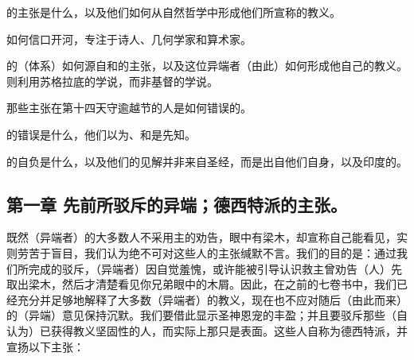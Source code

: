 的主张是什么，以及他们如何从自然哲学中形成他们所宣称的教义。\par

如何信口开河，专注于诗人、几何学家和算术家。\par

的（体系）如何源自和的主张，以及这位异端者（由此）如何形成他自己的教义。则利用苏格拉底的学说，而非基督的学说。\par

那些主张在第十四天守逾越节的人是如何错误的。\par

的错误是什么，他们以为、和是先知。\par

的自负是什么，以及他们的见解并非来自圣经，而是出自他们自身，以及印度的。\par


\subsection{第一章 先前所驳斥的异端；德西特派的主张。}

既然（异端者）的大多数人不采用主的劝告，眼中有梁木，却宣称自己能看见，实则劳苦于盲目，我们认为绝不可对这些人的主张缄默不言。我们的目的是：通过我们所完成的驳斥，（异端者）因自觉羞愧，或许能被引导认识救主曾劝告（人）先取出梁木，然后才清楚看见你兄弟眼中的木屑。因此，在之前的七卷书中，我们已经充分并足够地解释了大多数（异端者）的教义，现在也不应对随后（由此而来）的（异端）意见保持沉默。我们要借此显示圣神恩宠的丰盈；并且要驳斥那些（自认为）已获得教义坚固性的人，而实际上那只是表面。这些人自称为德西特派，并宣扬以下主张：\newline{}\par

